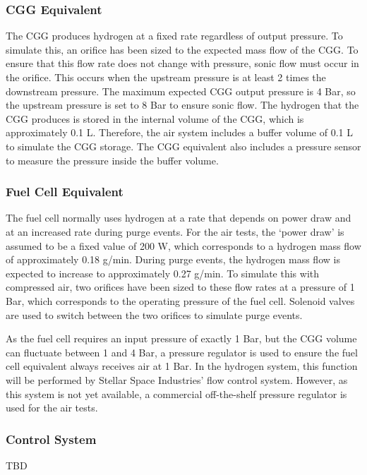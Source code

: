 \subsubsection*{CGG Equivalent}
The CGG produces hydrogen at a fixed rate regardless of output pressure. To simulate this, an orifice has been sized to the expected mass flow of the CGG. To ensure that this flow rate does not change with pressure, sonic flow must occur in the orifice. This occurs when the upstream pressure is at least 2 times the downstream pressure. The maximum expected CGG output pressure is 4 Bar, so the upstream pressure is set to 8 Bar to ensure sonic flow. The hydrogen that the CGG produces is stored in the internal volume of the CGG, which is approximately 0.1 L. Therefore, the air system includes a buffer volume of 0.1 L to simulate the CGG storage. The CGG equivalent also includes a pressure sensor to measure the pressure inside the buffer volume.

\subsubsection*{Fuel Cell Equivalent}
The fuel cell normally uses hydrogen at a rate that depends on power draw and at an increased rate during purge events. For the air tests, the `power draw' is assumed to be a fixed value of 200 W, which corresponds to a hydrogen mass flow of approximately 0.18 g/min. During purge events, the hydrogen mass flow is expected to increase to approximately 0.27 g/min. To simulate this with compressed air, two orifices have been sized to these flow rates at a pressure of 1 Bar, which corresponds to the operating pressure of the fuel cell. Solenoid valves are used to switch between the two orifices to simulate purge events.

As the fuel cell requires an input pressure of exactly 1 Bar, but the CGG volume can fluctuate between 1 and 4 Bar, a pressure regulator is used to ensure the fuel cell equivalent always receives air at 1 Bar. In the hydrogen system, this function will be performed by Stellar Space Industries' flow control system. However, as this system is not yet available, a commercial off-the-shelf pressure regulator is used for the air tests.

\subsubsection*{Control System}
TBD

\clearpage
